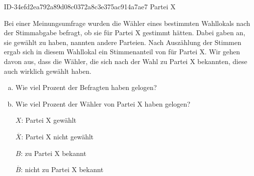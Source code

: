 \begin{exercise}
      {ID-34efd2ea792a89d08c0372a8c3e375ac914a7ae7}
      {Partei X}
  \ifproblem\problem\par
    Bei einer Meinungsumfrage wurden die Wähler
    eines bestimmten Wahllokals nach der
    Stimmabgabe befragt, ob sie für Partei X
    gestimmt hätten. Dabei gaben  an, sie
    gewählt zu haben,  nannten andere
    Parteien. Nach Auszählung der Stimmen ergab
    sich in diesem Wahllokal ein Stimmenanteil
    von  für Partei X. Wir gehen davon aus,
    dass die Wähler, die sich nach der Wahl zu
    Partei X bekannten, diese auch wirklich
    gewählt haben.
    \begin{enumerate}[a)]
      \item Wie viel Prozent der Befragten haben
            gelogen?
      \item Wie viel Prozent der Wähler von Partei
            X haben gelogen?
    \end{enumerate}
  \fi
  \ifoutcome\outcome\par
    \begin{minipage}[c]{0.38\linewidth}
      \begin{fofotab}%
      \end{fofotab}
    \end{minipage}%
    \begin{minipage}[c]{0.49\linewidth}
      \begin{itemize}
        \renewcommand{\itemsep}{-1ex}%
        \item[$X$:]\glqq Partei X gewählt\grqq
        \item[$\overline{X}$:]\glqq Partei X nicht gewählt\grqq
        \item[$B$:]\glqq zu Partei X bekannt\grqq
        \item[$\overline{B}$:]\glqq nicht zu Partei X bekannt\grqq
      \end{itemize}
    \end{minipage}\par

\end{exercise}
